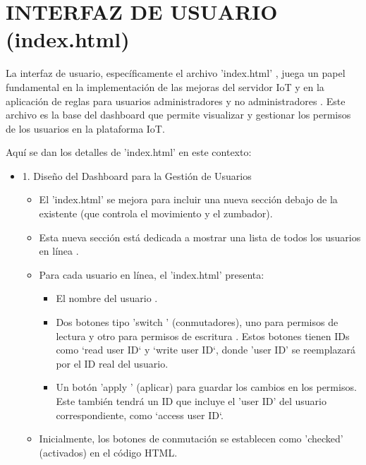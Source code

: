 \documentclass{report}
\begin{document}
\section{INTERFAZ DE USUARIO (index.html)}
La interfaz de usuario, específicamente el archivo  'index.html' , juega un papel fundamental en la implementación de las  mejoras del servidor IoT  
y en la aplicación de  reglas para usuarios administradores y no administradores . Este archivo es la base del  dashboard  que permite visualizar 
y gestionar los permisos de los usuarios en la plataforma IoT.

Aquí se dan los detalles de 'index.html' en este contexto:
\begin{itemize}
    \item 1. Diseño del Dashboard para la Gestión de Usuarios
    \begin{itemize}
        \item El 'index.html' se mejora para incluir una  nueva sección debajo de la existente  (que controla el movimiento y el zumbador).
        \item Esta nueva sección está dedicada a mostrar una  lista de todos los usuarios en línea .
        \item Para cada usuario en línea, el 'index.html' presenta:
        \begin{itemize}
            \item El  nombre del usuario .
            \item Dos botones tipo  'switch '  (conmutadores), uno para  permisos de lectura  y otro para  permisos de escritura . Estos botones tienen 
            IDs como `read user ID` y `write user ID`, donde 'user ID' se reemplazará por el ID real del usuario.
            \item Un  botón  'apply '  (aplicar) para guardar los cambios en los permisos. Este también tendrá un ID que incluye el 'user ID' del 
            usuario correspondiente, como `access user ID`.
        \end{itemize}
        \item Inicialmente, los botones de conmutación se establecen como 'checked' (activados) en el código HTML.
    \end{itemize}


\end{itemize}
\end{document}
